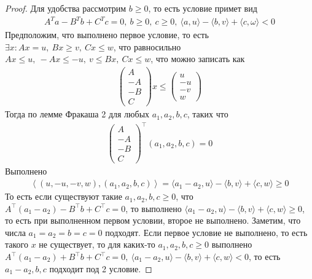 \begin{proof}
    Для удобства рассмотрим $b \geqslant 0$, то есть условие примет вид
    \begin{gather*}
        A^{T} a - B^{T} b+C^{T} c=0,\ b \geqslant 0,\ c \geqslant 0,\ \langle a, u\rangle-\langle b, v\rangle+\langle c, \omega\rangle<0
    \end{gather*}
    \vskip 0.1in \noindent
    Предположим, что выполнено первое условие, то есть $\exists x: Ax = u,\ Bx \geqslant v,\ Cx \leqslant w$, что равносильно $Ax \leqslant u,\ -Ax  \leqslant  -u,\ v \leqslant Bx,\ Cx \leqslant w$, что можно записать как
    \begin{gather*}
        \begin{pmatrix}
            A\\ -A\\ -B\\ C
        \end{pmatrix}
        x
        \leqslant
        \begin{pmatrix}
            u\\ -u\\ -v\\ w
        \end{pmatrix}
    \end{gather*}
    Тогда по лемме Фракаша 2 для любых $a_1, a_2, b, c$, таких что
    \begin{gather*}
        \begin{pmatrix}
            A\\ -A\\ -B\\ C
        \end{pmatrix}
        ^{\top}
        (a_1, a_2, b, c)
        = 0
    \end{gather*}
    Выполнено
    \begin{gather*}
        \left\langle 
        (u, -u, -v, w)
        ,
        (a_1, a_2, b, c)
        \right\rangle
        = \langle a_1 - a_2, u\rangle - \langle b,v \rangle + \langle c,w \rangle \geqslant 0
    \end{gather*}
    То есть если существуют такие  $a_1, a_2, b, c \geqslant 0$, что $A^{\top} (a_1 - a_2) - B^{\top} b + C^{\top} c = 0$, то выполнено $\langle a_1 - a_2, u\rangle - \langle b,v \rangle + \langle c,w \rangle \geqslant 0$, то есть при выполненном первом условии, второе не выполнено.
    \vskip 0.1in \noindent
    Заметим, что числа $a_1 = a_2 = b = c = 0$ подходят. Если первое условие не выполнено, то есть такого $x$ не существует, то для каких-то $a_1, a_2, b, c \geqslant 0$ выполнено $A^{\top} (a_1 - a_2) + B^{\top} b + C^{\top} c = 0,\ \langle a_1 - a_2, u\rangle - \langle b,v \rangle + \langle c,w \rangle < 0$, то есть $a_1 - a_2, b, c$ подходит под 2 условие.
\end{proof}
\vskip 0.6in




